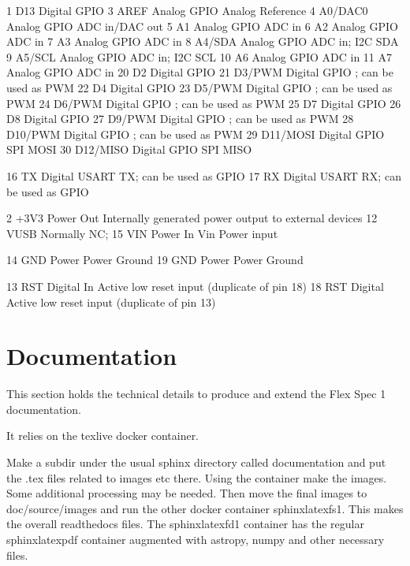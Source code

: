 \documentclass[letterpaper,10pt,english,openany,oneside]{sphinxmanual}
\begin{document}
\begin{sphinxVerbatim}[commandchars=\\\{\},numbers=left,firstnumber=1,stepnumber=1]
1  D13          Digital GPIO
3  AREF         Analog  GPIO  Analog Reference
4  A0/DAC0      Analog  GPIO  ADC in/DAC out
5  A1           Analog  GPIO  ADC in
6  A2           Analog  GPIO  ADC in
7  A3           Analog  GPIO  ADC in
8  A4/SDA       Analog  GPIO  ADC in; I2C SDA
9  A5/SCL       Analog  GPIO  ADC in; I2C SCL
10 A6           Analog  GPIO  ADC in
11 A7           Analog  GPIO  ADC in
20 D2           Digital GPIO
21 D3/PWM       Digital GPIO  ; can be used as PWM
22 D4           Digital GPIO
23 D5/PWM       Digital GPIO  ; can be used as PWM
24 D6/PWM       Digital GPIO  ; can be used as PWM
25 D7           Digital GPIO
26 D8           Digital GPIO
27 D9/PWM       Digital GPIO  ; can be used as PWM
28 D10/PWM      Digital GPIO  ; can be used as PWM
29 D11/MOSI     Digital GPIO  SPI MOSI
30 D12/MISO     Digital GPIO  SPI MISO


16 TX           Digital USART TX; can be used as GPIO
17 RX           Digital USART RX; can be used as GPIO


2  +3V3 Power Out Internally generated power output to external devices
12 VUSB Normally NC;
15 VIN Power In Vin Power input

14 GND Power Power Ground
19 GND Power Power Ground

13 RST          Digital In Active low reset input (duplicate of pin 18)
18 RST          Digital Active low reset input (duplicate of pin 13)
\end{sphinxVerbatim}
\begin{quote}

\sphinxAtStartPar
{}
\end{quote}


\chapter{Documentation}
\label{\detokenize{documentation:documentation}}\label{\detokenize{documentation::doc}}
\sphinxAtStartPar
This section holds the technical details to produce and extend
the Flex Spec 1 documentation.

\sphinxAtStartPar
It relies on the texlive docker container.

\sphinxAtStartPar
Make a subdir under the usual sphinx directory called documentation
and put the .tex files related to images etc there. Using the container
make the images. Some additional processing may be needed. Then
move the final images to doc/source/images and run the other
docker container sphinx\sphinxhyphen{}latex\sphinxhyphen{}fs1. This makes the overall
readthedocs files. The sphinx\sphinxhyphen{}latex\sphinxhyphen{}fd1 container has the regular
sphinx\sphinxhyphen{}latexpdf container augmented with astropy, numpy and other
necessary files.
\end{document}
